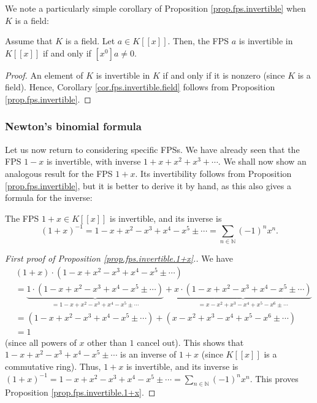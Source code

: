We note a particularly simple corollary of Proposition
\ref{prop.fps.invertible} when $K$ is a field:

\begin{corollary}
\label{cor.fps.invertible.field}Assume that $K$ is a field. Let $a\in K\left[
\left[  x\right]  \right]  $. Then, the FPS $a$ is invertible in $K\left[
\left[  x\right]  \right]  $ if and only if $\left[  x^{0}\right]  a\neq0$.
\end{corollary}

\begin{proof}
An element of $K$ is invertible in $K$ if and only if it is nonzero (since $K$
is a field). Hence, Corollary \ref{cor.fps.invertible.field} follows from
Proposition \ref{prop.fps.invertible}.
\end{proof}

\subsubsection{Newton's binomial formula}

Let us now return to considering specific FPSs. We have already seen that the
FPS $1-x$ is invertible, with inverse $1+x+x^{2}+x^{3}+\cdots$. We shall now
show an analogous result for the FPS $1+x$. Its invertibility follows from
Proposition \ref{prop.fps.invertible}, but it is better to derive it by hand,
as this also gives a formula for the inverse:

\begin{proposition}
\label{prop.fps.invertible.1+x}The FPS $1+x\in K\left[  \left[  x\right]
\right]  $ is invertible, and its inverse is%
\[
\left(  1+x\right)  ^{-1}=1-x+x^{2}-x^{3}+x^{4}-x^{5}\pm\cdots=\sum
_{n\in\mathbb{N}}\left(  -1\right)  ^{n}x^{n}.
\]

\end{proposition}

\begin{proof}
[First proof of Proposition \ref{prop.fps.invertible.1+x}.]We have%
\begin{align*}
&  \left(  1+x\right)  \cdot\left(  1-x+x^{2}-x^{3}+x^{4}-x^{5}\pm
\cdots\right) \\
&  =\underbrace{1\cdot\left(  1-x+x^{2}-x^{3}+x^{4}-x^{5}\pm\cdots\right)
}_{=1-x+x^{2}-x^{3}+x^{4}-x^{5}\pm\cdots}+\underbrace{x\cdot\left(
1-x+x^{2}-x^{3}+x^{4}-x^{5}\pm\cdots\right)  }_{=x-x^{2}+x^{3}-x^{4}%
+x^{5}-x^{6}\pm\cdots}\\
&  =\left(  1-x+x^{2}-x^{3}+x^{4}-x^{5}\pm\cdots\right)  +\left(
x-x^{2}+x^{3}-x^{4}+x^{5}-x^{6}\pm\cdots\right) \\
&  =1
\end{align*}
(since all powers of $x$ other than $1$ cancel out). This shows that
$1-x+x^{2}-x^{3}+x^{4}-x^{5}\pm\cdots$ is an inverse of $1+x$ (since $K\left[
\left[  x\right]  \right]  $ is a commutative ring). Thus, $1+x$ is
invertible, and its inverse is $\left(  1+x\right)  ^{-1}=1-x+x^{2}%
-x^{3}+x^{4}-x^{5}\pm\cdots=\sum_{n\in\mathbb{N}}\left(  -1\right)  ^{n}x^{n}%
$. This proves Proposition \ref{prop.fps.invertible.1+x}.
\end{proof}

